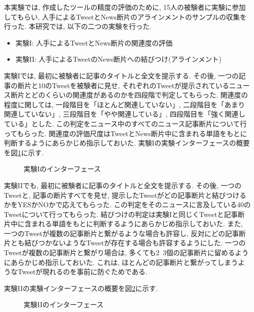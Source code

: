 \documentclass[12pt]{jarticle}
\begin{document}
本実験では, 作成したツールの精度の評価のために, 15人の被験者に実験に参加してもらい, 人手によるTweetとNews断片のアラインメントのサンプルの収集を行った.
本研究では, 以下の二つの実験を行った.
\begin{itemize}
  \item 実験I: 人手によるTweetとNews断片の関連度の評価
  \item 実験II: 人手によるTweetのNews断片への結びつけ(アラインメント)
\end{itemize}

実験Iでは, 最初に被験者に記事のタイトルと全文を提示する.
その後, 一つの記事の断片と10のTweetを被験者に見せ, それぞれのTweetが提示されているニュース断片とどのくらいの関連度があるのかを四段階で判定してもらった.
関連度の程度に関しては,
一段階目を「ほとんど関連していない」,
二段階目を「あまり関連していない」,
三段階目を「やや関連している」,
四段階目を「強く関連している」とした.
この判定をニュース中のすべてのニュース記事断片について行ってもらった.
関連度の評価尺度はTweetとNews断片中に含まれる単語をもとに判断するようにあらかじめ指示しておいた.
実験Iの実験インターフェースの概要を図\ref{annotation_by_human_A}に示す.

\begin{figure}[t]
  \begin{center}
  \end{center}
  \label{annotation_by_human_A}
  \caption{実験Iのインターフェース}
\end{figure}

実験IIでも, 最初に被験者に記事のタイトルと全文を提示する.
その後, 一つのTweetと, 記事の断片すべてを見せ, 提示したTweetがどの記事断片と結びつけるかをYESかNOかで応えてもらった.
この判定をそのニュースに言及している40のTweetについて行ってもらった.
結びつけの判定は実験Iと同じくTweetと記事断片中に含まれる単語をもとに判断するようにあらかじめ指示しておいた.
また, 一つのTweetが複数の記事断片と繋がるような場合も許容し, 反対にどの記事断片とも結びつかないようなTweetが存在する場合も許容するようにした.
一つのTweetが複数の記事断片と繋がり場合は, 多くても2~3個の記事断片に留めるようにあらかじめ指示しておいた.
これは, ほとんどの記事断片と繋がってしまうようなTweetが現れるのを事前に防ぐためである.

実験IIの実験インターフェースの概要を図\ref{annotation_by_human_B}に示す.

\begin{figure}[t]
  \begin{center}
  \end{center}
  \label{annotation_by_human_B}
  \caption{実験IIのインターフェース}
\end{figure}
\end{document}
